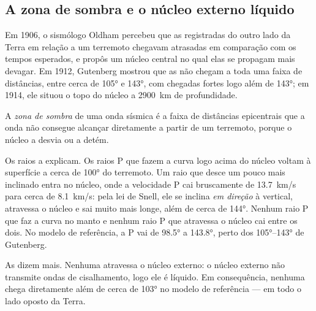 \subsection{A zona de sombra e o núcleo externo líquido}

Em 1906, o sismólogo Oldham percebeu que as  registradas do outro lado
da Terra em relação a um terremoto chegavam atrasadas em comparação com os
tempos esperados, e propôs um núcleo central no qual elas se propagam mais
devagar. Em 1912, Gutenberg mostrou que as  não chegam a toda uma
faixa de distâncias, entre cerca de \ang{105} e \ang{143}, com chegadas
fortes logo além de \ang{143}; em 1914, ele situou o topo do núcleo a
\qty{2900}{km} de profundidade.

\begin{definition}\label{def:g11:seismic-structure:shadow-zone}
A \emph{zona de sombra} de uma onda sísmica é a faixa
de distâncias epicentrais que a onda não consegue alcançar diretamente a
partir de um terremoto, porque o núcleo a desvia ou a detém.
\end{definition}

Os raios a explicam. Os raios P que fazem a curva logo acima do núcleo
voltam à superfície a cerca de \ang{100} do terremoto. Um raio que desce um
pouco mais inclinado entra no núcleo, onde a velocidade P cai bruscamente de
\qty{13.7}{km/s} para cerca de \qty{8.1}{km/s}: pela lei de Snell, ele se
inclina \emph{em direção} à vertical, atravessa o núcleo e sai muito mais
longe, além de cerca de \ang{144}. Nenhum raio P que faz a curva no manto e
nenhum raio P que atravessa o núcleo cai entre os dois. No modelo de
referência, a  P vai de \ang{98.5} a \ang{143.8}, perto dos
\ang{105}--\ang{143} de Gutenberg.

As  dizem mais. Nenhuma  atravessa o núcleo externo: o núcleo
externo não transmite ondas de cisalhamento, logo ele é líquido. Em
consequência, nenhuma  chega diretamente além de cerca de \ang{103} no
modelo de referência --- em todo o lado oposto da Terra.

